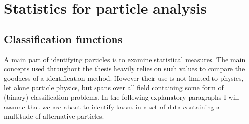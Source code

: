 \chapter{Statistics for particle analysis}
\label{chap:statistics}

\section{Classification functions}
\label{sec:classification_functions}

A main part of identifying particles is to examine statistical measures. The main concepts used throughout the thesis heavily relies on such values to compare the goodness of a identification method. However their use is not limited to physics, let alone particle physics, but spans over all field containing some form of (binary) classification problems.
In the following explanatory paragraphs I will assume that we are about to identify kaons in a set of data containing a multitude of alternative particles.

